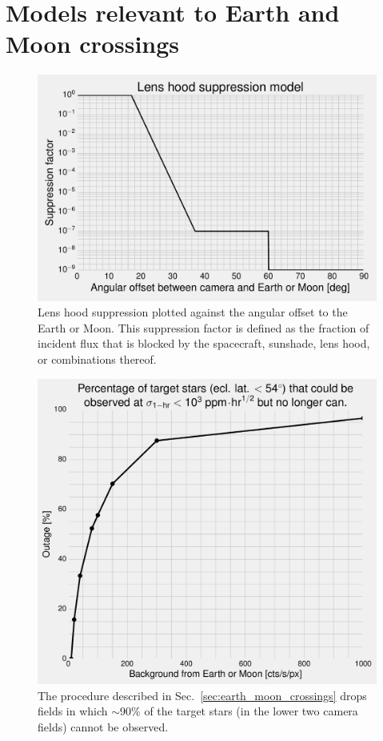 \section{Models relevant to Earth and Moon crossings}
\label{sec:appendix}

\begin{figure}[!h] %
	\centering
	\includegraphics{figures/lens_hood_suppression.pdf}
	\caption{Lens hood suppression plotted against the angular offset to the Earth or Moon. This suppression factor is defined as the fraction of incident flux that is blocked by the spacecraft, sunshade, lens hood, or combinations thereof.}
	\label{fig:lens_hood_suppression}
\end{figure}
\newpage
\begin{figure}[!t] %
	\centering
	\includegraphics{figures/outage_vs_background.pdf}
	\caption{The procedure described in Sec.~\protect\ref{sec:earth_moon_crossings} drops fields in which $\sim$90\% of the target stars (in the lower two camera fields) cannot be observed.}
	\label{fig:outage_vs_background}
\end{figure}
